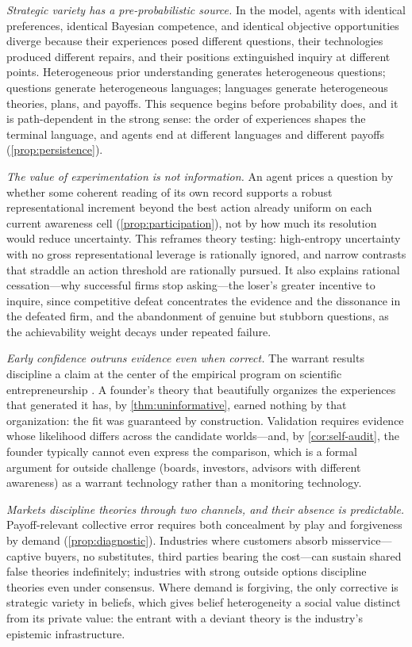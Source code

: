 \documentclass[11pt]{article}
\theoremstyle{definition}
\begin{document}
\emph{Strategic variety has a pre-probabilistic source.}
In the model, agents with identical preferences, identical Bayesian competence, and identical objective opportunities diverge because their experiences posed different questions, their technologies produced different repairs, and their positions extinguished inquiry at different points.
Heterogeneous prior understanding generates heterogeneous questions; questions generate heterogeneous languages; languages generate heterogeneous theories, plans, and payoffs.
This sequence begins before probability does, and it is path-dependent in the strong sense: the order of experiences shapes the terminal language, and agents end at different languages and different payoffs (\cref{prop:persistence}).

\emph{The value of experimentation is not information.}
An agent prices a question by whether some coherent reading of its own record supports a robust representational increment beyond the best action already uniform on each current awareness cell (\cref{prop:participation}), not by how much its resolution would reduce uncertainty.
This reframes theory testing: high-entropy uncertainty with no gross representational leverage is rationally ignored, and narrow contrasts that straddle an action threshold are rationally pursued.
It also explains rational cessation---why successful firms stop asking---the loser's greater incentive to inquire, since competitive defeat concentrates the evidence and the dissonance in the defeated firm, and the abandonment of genuine but stubborn questions, as the achievability weight decays under repeated failure.

\emph{Early confidence outruns evidence even when correct.}
The warrant results discipline a claim at the center of the empirical program on scientific entrepreneurship \citep{CamuffoEtAl2020,ZellwegerZenger2023}.
A founder's theory that beautifully organizes the experiences that generated it has, by \cref{thm:uninformative}, earned nothing by that organization: the fit was guaranteed by construction.
Validation requires evidence whose likelihood differs across the candidate worlds---and, by \cref{cor:self-audit}, the founder typically cannot even express the comparison, which is a formal argument for outside challenge (boards, investors, advisors with different awareness) as a warrant technology rather than a monitoring technology.

\emph{Markets discipline theories through two channels, and their absence is predictable.}
Payoff-relevant collective error requires both concealment by play and forgiveness by demand (\cref{prop:diagnostic}).
Industries where customers absorb misservice---captive buyers, no substitutes, third parties bearing the cost---can sustain shared false theories indefinitely; industries with strong outside options discipline theories even under consensus.
Where demand is forgiving, the only corrective is strategic variety in beliefs, which gives belief heterogeneity a social value distinct from its private value: the entrant with a deviant theory is the industry's epistemic infrastructure.
\end{document}
